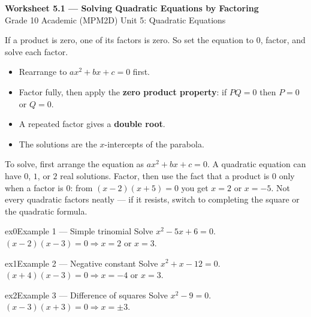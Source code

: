 \documentclass[11pt]{article}
\begin{document}
\begin{center}
{\LARGE\bfseries\color{titleblue}Worksheet 5.1 --- Solving Quadratic Equations by Factoring}\\[2pt]
{\small Grade 10 Academic (MPM2D) \textperiodcentered{} Unit 5: Quadratic Equations}
\end{center}

\begin{ideabox}
If a product is zero, one of its factors is zero. So set the equation to $0$, factor, and solve each factor.
\begin{itemize}[leftmargin=*,itemsep=2pt]
  \item Rearrange to $ax^2+bx+c=0$ first.
  \item Factor fully, then apply the \textbf{zero product property}: if $PQ=0$ then $P=0$ or $Q=0$.
  \item A repeated factor gives a \textbf{double root}.
  \item The solutions are the $x$-intercepts of the parabola.
\end{itemize}
\end{ideabox}

\begin{learnbox}
To solve, first arrange the equation as $ax^2+bx+c=0$. A quadratic equation can have $0$, $1$, or $2$ real solutions.
Factor, then use the fact that a product is $0$ only when a factor is $0$: from $(x-2)(x+5)=0$ you get $x=2$ or $x=-5$.
Not every quadratic factors neatly — if it resists, switch to completing the square or the quadratic formula.
\end{learnbox}


\begin{example}{ex0}{Example 1 --- Simple trinomial}
Solve $x^2-5x+6=0$.
\soln $(x-2)(x-3)=0\Rightarrow x=2$ or $x=3.$
\end{example}

\begin{example}{ex1}{Example 2 --- Negative constant}
Solve $x^2+x-12=0$.
\soln $(x+4)(x-3)=0\Rightarrow x=-4$ or $x=3.$
\end{example}

\begin{example}{ex2}{Example 3 --- Difference of squares}
Solve $x^2-9=0$.
\soln $(x-3)(x+3)=0\Rightarrow x=\pm3.$
\end{example}
\end{document}
